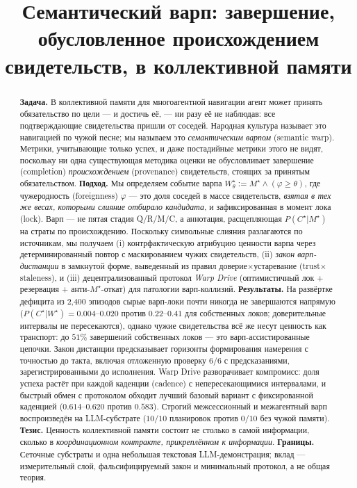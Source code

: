 \documentclass{article}
\title{Семантический варп: завершение, обусловленное происхождением\\свидетельств, в коллективной памяти}
\newcommand{\wstar}{W^{\star}}
\newcommand{\mstar}{M^{\star}}
\newcommand{\cstar}{C^{\star}}
\begin{document}
\maketitle

\begin{abstract}
\textbf{Задача.} В коллективной памяти для многоагентной навигации агент может принять обязательство по цели --- и достичь её, --- ни разу её не наблюдав: все подтверждающие свидетельства пришли от соседей. Народная культура называет это навигацией по чужой песне; мы называем это \emph{семантическим варпом} (semantic warp). Метрики, учитывающие только успех, и даже постадийные метрики этого не видят, поскольку ни одна существующая методика оценки не обусловливает завершение (completion) \emph{происхождением} (provenance) свидетельств, стоящих за принятым обязательством.
\textbf{Подход.} Мы определяем событие варпа $\wstar_\theta := \mstar \wedge (\varphi \ge \theta)$, где чужеродность (foreignness) $\varphi$ --- это доля соседей в массе свидетельств, \emph{взятая в тех же весах, которыми слияние отбирало кандидата}, и зафиксированная в момент лока (lock). Варп --- не пятая стадия Q/R/M/C, а аннотация, расщепляющая $P(\cstar|\mstar)$ на страты по происхождению. Поскольку символьные слияния разлагаются по источникам, мы получаем (i) контрфактическую атрибуцию ценности варпа через детерминированный повтор с маскированием чужих свидетельств, (ii) \emph{закон варп-дистанции} в замкнутой форме, выведенный из правил доверие$\times$устаревание (trust$\times$staleness), и (iii) децентрализованный протокол \emph{Warp Drive} (оптимистичный лок + резервация + анти-$\mstar$-откат) для патологии варп-коллизий.
\textbf{Результаты.} На развёртке дефицита из 2{,}400 эпизодов сырые варп-локи почти никогда не завершаются напрямую ($P(\cstar|\wstar)=0.004$--$0.020$ против $0.22$--$0.41$ для собственных локов; доверительные интервалы не пересекаются), однако чужие свидетельства всё же несут ценность как транспорт: до $51\%$ завершений собственных локов --- это варп-ассистированные цепочки. Закон дистанции предсказывает горизонты формирования намерения с точностью до такта, включая отложенную проверку $6/6$ с предсказаниями, зарегистрированными до исполнения. Warp Drive разворачивает компромисс: доля успеха растёт при каждой каденции (cadence) с непересекающимися интервалами, и быстрый обмен с протоколом обходит лучший базовый вариант с фиксированной каденцией ($0.614$--$0.620$ против $0.583$). Строгий межсессионный и межагентный варп воспроизведён на LLM-субстрате ($10/10$ планировок против $0/10$ без чужой памяти).
\textbf{Тезис.} Ценность коллективной памяти состоит не столько в самой информации, сколько в \emph{координационном контракте, прикреплённом к информации}.
\textbf{Границы.} Сеточные субстраты и одна небольшая текстовая LLM-демонстрация; вклад --- измерительный слой, фальсифицируемый закон и минимальный протокол, а не общая теория.
\end{abstract}
\end{document}
